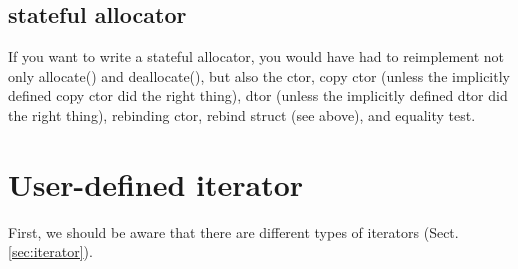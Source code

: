 \subsection{stateful allocator}

If you want to write a stateful allocator, you would have had to reimplement not
only allocate() and deallocate(), but also the ctor, copy ctor (unless the implicitly
defined copy ctor did the right thing), dtor (unless the implicitly defined dtor
did the right thing), rebinding ctor, rebind struct (see above), and equality
test.    


\section{User-defined iterator}
\label{sec:iterator-user-defined}


First, we should be aware that there are different types of iterators (Sect.\ref{sec:iterator}).

